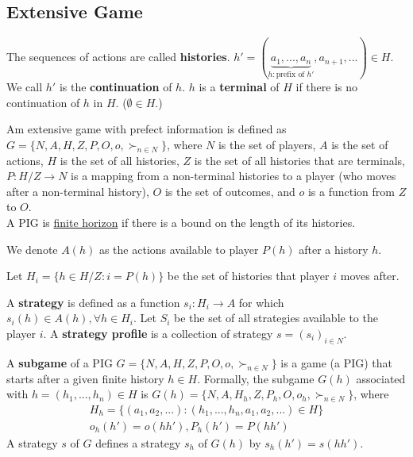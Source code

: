 \documentclass[11pt]{elegantbook}
\begin{document}
\subsection{Extensive Game}
\begin{definition}[History]
    \normalfont
    The sequences of actions are called \textbf{histories}. $h'=(\underbrace{a_1,...,a_n}_{h: \text{prefix of }h'},a_{n+1},...)\in H$. We call $h'$ is the \textbf{continuation} of $h$. $h$ is a \textbf{terminal} of $H$ if there is no continuation of $h$ in $H$. ($\emptyset\in H$.)
\end{definition}

\begin{definition}
    \normalfont
    Am extensive game with prefect information is defined as $G=\{N,A,H,Z,P,O,o,\succ_{n\in N}\}$, where $N$ is the set of players, $A$ is the set of actions, $H$ is the set of all histories, $Z$ is the set of all histories that are terminals, $P:H/Z \rightarrow N$ is a mapping from a non-terminal histories to a player (who moves after a non-terminal history), $O$ is the set of outcomes, and $o$ is a function from $Z$ to $O$.\\
    A PIG is \underline{finite horizon} if there is a bound on the length of its histories.
\end{definition}


We denote $A(h)$ as the actions available to player $P(h)$ after a history $h$.

Let $H_i=\{h\in H/Z:i=P(h)\}$ be the set of histories that player $i$ moves after.

\begin{definition}[Strategy]
    \normalfont
    A \textbf{strategy} is defined as a function $s_i:H_i \rightarrow A$ for which $s_i(h)\in A(h),\forall h\in H_i$. Let $S_i$ be the set of all strategies available to the player $i$. A \textbf{strategy profile} is a collection of strategy $s=(s_i)_{i\in N}$.
\end{definition}



\begin{definition}[Subgame]
\normalfont
    A \textbf{subgame} of a PIG $G=\{N,A,H,Z,P,O,o,\succ_{n\in N}\}$ is a game (a PIG) that starts after a given finite history $h\in H$. Formally, the subgame $G(h)$ associated with $h=(h_1,...,h_n)\in H$ is $G(h)=\{N,A,H_h,Z,P_h,O,o_h,\succ_{n\in N}\}$, where
    \begin{equation}
        \begin{aligned}
            H_h=\{(a_1,a_2,...):(h_1,...,h_n,a_1,a_2,...)\in H\}\\
            o_h(h')=o(hh'), P_h(h')=P(hh')
        \end{aligned}
        \nonumber
    \end{equation}
    A strategy $s$ of $G$ defines a strategy $s_h$ of $G(h)$ by $s_h(h')=s(hh')$.
\end{definition}
\end{document}
